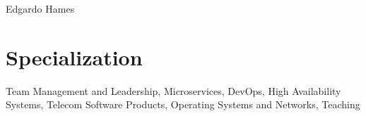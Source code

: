 \documentclass[10pt]{article}
\begin{document}
\color{text1} %


{\sffamily\Huge Edgardo Hames}


\begin{minipage}[t]{0.5\textwidth} %
\vspace{0pt} %
	


\section{Specialization}
Team Management and Leadership, Microservices, DevOps, High Availability Systems, Telecom Software Products, Operating Systems and Networks, Teaching\\[10pt]



\end{minipage}
\end{document}
